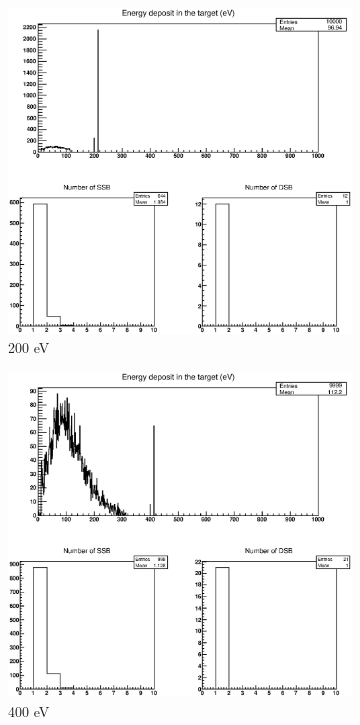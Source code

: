 \begin{figure}
\centering
\begin{subfigure}{.5\textwidth}
  \centering
  \includegraphics[width=.78\linewidth]{./Figures/1zbbp200ev.eps}
  \caption{200 eV}
  \label{fig:sub1}
\end{subfigure}%
\begin{subfigure}{.5\textwidth}
  \centering
  \includegraphics[width=.78\linewidth]{./Figures/1zbbp400ev.eps}
  \caption{400 eV}
  \label{fig:sub2}
\end{subfigure}
\begin{subfigure}{.5\textwidth}
  \centering

\end{subfigure}
\end{figure}
